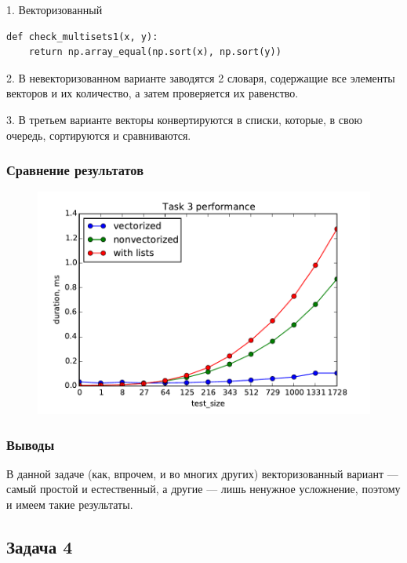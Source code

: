 \documentclass[12pt]{article}
\begin{document}
1. Векторизованный
\begin{lstlisting}
def check_multisets1(x, y):
    return np.array_equal(np.sort(x), np.sort(y))
\end{lstlisting}

2. В невекторизованном варианте заводятся 2 словаря, содержащие все элементы векторов и их количество, а затем проверяется их равенство.

3. В третьем варианте векторы конвертируются в списки, которые, в свою очередь, сортируются и сравниваются.


\subsubsection*{Сравнение результатов}

\begin{figure}[h]
	\begin{center}
		\includegraphics[scale=0.7]{task3}
	\end{center}
\end{figure}

\subsubsection*{Выводы}

В данной задаче (как, впрочем, и во многих других) векторизованный вариант --- самый простой и естественный, а другие --- лишь ненужное усложнение, поэтому и имеем такие результаты.

\subsection{Задача 4}
\end{document}
